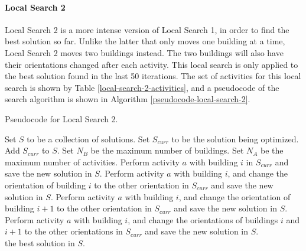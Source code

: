 \paragraph{Local Search 2}
Local Search 2 is a more intense version of Local Search 1, in order to find the best solution so far. Unlike the latter that only moves one building at a time, Local Search 2 moves two buildings instead. The two buildings will also have their orientations changed after each activity. This local search is only applied to the best solution found in the last 50 iterations. The set of activities for this local search is shown by Table \ref{local-search-2-activities}, and a pseudocode of the search algorithm is shown in Algorithm \ref{pseudocode-local-search-2}.

\begin{algorithm}[h!]
	\caption{Pseudocode for Local Search 2.}
	\label{pseudocode-local-search-2}
	\begin{algorithmic}[1]
		\State Set $S$ to be a collection of solutions.
		\State Set $S_{curr}$ to be the solution being optimized.
		\State Add $S_{curr}$ to $S$.
		\State Set $N_{B}$ be the maximum number of buildings.
		\State Set $N_{A}$ be the maximum number of activities.
		\State Perform activity $a$ with building $i$ in $S_{curr}$ and save the new solution in $S$.
		\State Perform activity $a$ with building $i$, and change the orientation of \WRP building $i$ to the other orientation in $S_{curr}$ and save the new \WRP solution in $S$.
		\State Perform activity $a$ with building $i$, and change the orientation of \WRP building $i + 1$ to the other orientation in $S_{curr}$ and save the new \WRP solution in $S$.
		\State Perform activity $a$ with building $i$, and change the orientations of \WRP buildings $i$ and $i + 1$ to the other orientations in $S_{curr}$ and save the new \WRP solution in $S$.
		\EndFor
		\EndFor \\
		\Return the best solution in $S$.
	\end{algorithmic}
\end{algorithm}

